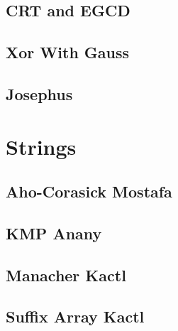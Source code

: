 \subsection{CRT and EGCD}
\vspace{-2ex}
\raggedbottom
\vspace{-3.2ex}
\hrulefill
\subsection{Xor With Gauss}
\vspace{-2ex}
\raggedbottom
\vspace{-3.2ex}
\hrulefill
\subsection{Josephus}
\vspace{-2ex}
\raggedbottom
\vspace{-3.2ex}
\hrulefill

\section{Strings}
\subsection{Aho-Corasick Mostafa}
\vspace{-2ex}
\raggedbottom
\vspace{-3.2ex}
\hrulefill
\subsection{KMP Anany}
\vspace{-2ex}
\raggedbottom
\vspace{-3.2ex}
\hrulefill
\subsection{Manacher Kactl}
\vspace{-2ex}
\raggedbottom
\vspace{-3.2ex}
\hrulefill
\subsection{Suffix Array Kactl}
\vspace{-2ex}
\raggedbottom
\vspace{-3.2ex}
\hrulefill
